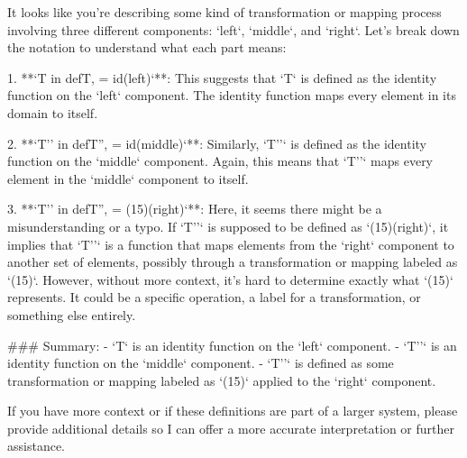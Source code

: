 It looks like you're describing some kind of transformation or mapping process involving three different components: `left`, `middle`, and `right`. Let's break down the notation to understand what each part means:

1. **`T in defT, = id(left)`**: This suggests that `T` is defined as the identity function on the `left` component. The identity function maps every element in its domain to itself.

2. **`T'' in defT'', = id(middle)`**: Similarly, `T''` is defined as the identity function on the `middle` component. Again, this means that `T''` maps every element in the `middle` component to itself.

3. **`T'' in defT'', = (15)(right)`**: Here, it seems there might be a misunderstanding or a typo. If `T''` is supposed to be defined as `(15)(right)`, it implies that `T''` is a function that maps elements from the `right` component to another set of elements, possibly through a transformation or mapping labeled as `(15)`. However, without more context, it's hard to determine exactly what `(15)` represents. It could be a specific operation, a label for a transformation, or something else entirely.

### Summary:
- `T` is an identity function on the `left` component.
- `T''` is an identity function on the `middle` component.
- `T''` is defined as some transformation or mapping labeled as `(15)` applied to the `right` component.

If you have more context or if these definitions are part of a larger system, please provide additional details so I can offer a more accurate interpretation or further assistance.